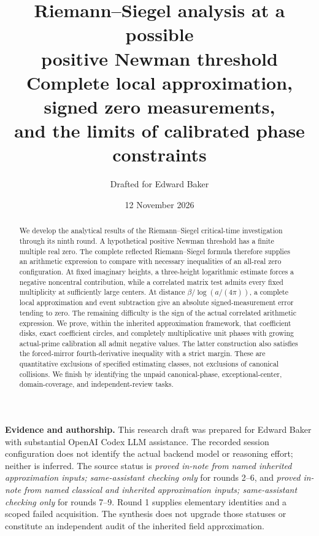 \documentclass[11pt]{article}
\title{Riemann--Siegel analysis at a possible\\positive Newman threshold\\[0.5em]
 \large Complete local approximation, signed zero measurements,\\
 and the limits of calibrated phase constraints}
\author{Drafted for Edward Baker}
\date{12 November 2026}
\numberwithin{equation}{section}
\theoremstyle{definition}
\theoremstyle{remark}
\begin{document}
\maketitle
\begin{abstract}
We develop the analytical results of the Riemann--Siegel critical-time
investigation through its ninth round. A hypothetical positive Newman
threshold has a finite multiple real zero. The complete reflected
Riemann--Siegel formula therefore supplies an arithmetic expression to
compare with necessary inequalities of an all-real zero configuration.
At fixed imaginary heights, a three-height logarithmic estimate forces a
negative noncentral contribution, while a correlated matrix test admits
every fixed multiplicity at sufficiently large centers. At distance
\(\beta/\log(a/(4\pi))\), a complete local approximation and event
subtraction give an absolute signed-measurement error tending to zero.
The remaining difficulty is the sign of the actual correlated arithmetic
expression. We prove, within the inherited approximation framework, that
coefficient disks, exact coefficient circles, and completely
multiplicative unit phases with growing actual-prime calibration all
admit negative values. The latter construction also satisfies the
forced-mirror fourth-derivative inequality with a strict margin.
These are quantitative exclusions of specified estimating classes,
not exclusions of canonical collisions. We finish by identifying the
unpaid canonical-phase, exceptional-center, domain-coverage, and
independent-review tasks.
\end{abstract}

\noindent\textbf{Evidence and authorship.}
This research draft was prepared for Edward Baker with substantial
OpenAI Codex LLM assistance. The recorded session configuration does not
identify the actual backend model or reasoning effort; neither is
inferred. The source status is \emph{proved in-note from named inherited
approximation inputs; same-assistant checking only} for rounds 2--6,
and \emph{proved in-note from named classical and inherited approximation
inputs; same-assistant checking only} for rounds 7--9.
Round 1 supplies elementary identities and a scoped failed acquisition.
The synthesis does not upgrade those statuses or constitute an
independent audit of the inherited field approximation.

\clearpage
{\small\tableofcontents}
\clearpage










\end{document}
